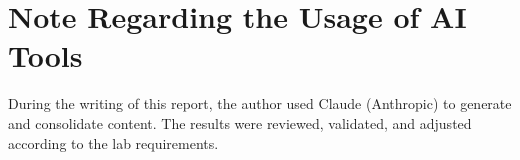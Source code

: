 \section{Note Regarding the Usage of AI Tools}

During the writing of this report, the author used Claude (Anthropic) to generate and consolidate content. The results were reviewed, validated, and adjusted according to the lab requirements.
